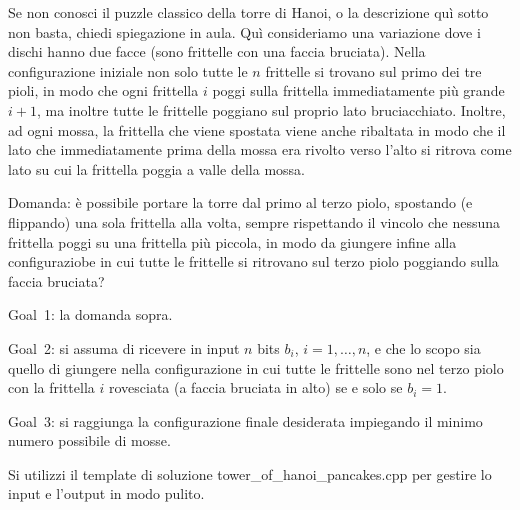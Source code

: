 \renewcommand{\nomebreve}{tower\_of\_hanoi\_pancakes}
\renewcommand{\titolo}{Hanoi tower with two-sided disks}

\introduzione{}

Se non conosci il puzzle classico della torre di Hanoi, o la descrizione quì sotto non basta, chiedi spiegazione in aula. Quì consideriamo una variazione dove i dischi hanno due facce (sono frittelle con una faccia bruciata).
Nella configurazione iniziale non solo tutte le $n$ frittelle si trovano sul primo dei tre pioli, in modo che ogni frittella $i$ poggi sulla frittella immediatamente più grande $i+1$, ma inoltre tutte le frittelle poggiano sul proprio lato bruciacchiato.
Inoltre, ad ogni mossa, la frittella che viene spostata viene anche ribaltata in modo che il lato che immediatamente prima della mossa era rivolto verso l'alto si ritrova come lato su cui la frittella poggia a valle della mossa.

Domanda: è possibile portare la torre dal primo al terzo piolo, spostando (e flippando) una sola frittella alla volta, sempre rispettando il vincolo che nessuna frittella poggi su una frittella più piccola, in modo da giungere infine alla configuraziobe in cui tutte le frittelle si ritrovano sul terzo piolo poggiando sulla faccia bruciata?

Goal~1: la domanda sopra.

Goal~2: si assuma di ricevere in input $n$ bits $b_i$, $i=1,\ldots, n$,
e che lo scopo sia quello di giungere nella configurazione in cui tutte le frittelle sono nel terzo piolo con la frittella $i$ rovesciata (a faccia bruciata in alto) se e solo se $b_i = 1$.

Goal~3: si raggiunga la configurazione finale desiderata impiegando il minimo numero possibile di mosse.





Si utilizzi il template di soluzione {\sc tower\_of\_hanoi\_pancakes.cpp}
per gestire lo input e l'output in modo pulito.



